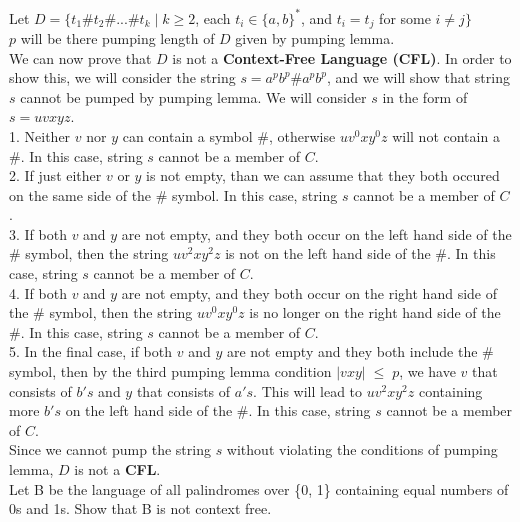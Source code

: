 \documentclass[12pt]{article}
\begin{document}
Let $D = \{t_1 \# t_2 \# ... \# t_k \; | \; k \geq 2$, each $t_i \in \{a, b\}^*$, and $t_i = t_j$ for some $i \ne j \} $ \\
$p$ will be there pumping length of $D$ given by pumping lemma. \\

We can now prove that $D$ is not a \textbf{Context-Free Language (CFL)}.
In order to show this, we will consider the string $s = a^p b^p \# a^p b^p $,
and we will show that string $s$ cannot be pumped by pumping lemma. We will
consider $s$ in the form of $s = uvxyz$. \\

1. Neither $v$ nor $y$ can contain a symbol $\#$, otherwise $u v^0 x y^0 z$
will not contain a $\#$. In this case, string $s$ cannot be a member of $C$. \\

2. If just either $v$ or $y$ is not empty, than we can assume that they both occured
on the same side of the $\#$ symbol. In this case, string $s$ cannot be a member of $C$. \\

3. If both $v$ and $y$ are not empty, and they both occur on the left hand side
of the $\#$ symbol, then the string $u v^2 x y^2 z$ is not on the left hand
side of the $\#$. In this case, string $s$ cannot be a member of $C$. \\

4. If both $v$ and $y$ are not empty, and they both occur on the right hand side
of the $\#$ symbol, then the string $u v^0 x y^0 z$ is no longer on the
right hand side of the $\#$. In this case, string $s$ cannot be a member of $C$. \\

5. In the final case, if both $v$ and $y$ are not empty and they both include
the $\#$ symbol, then by the third pumping lemma condition $|vxy| \; \le \; p$,
we have $v$ that consists of $b's$ and $y$ that consists of $a's$. This will
lead to $u v^2 x y^2 z$ containing more $b's$ on the left hand side of the $\#$.
In this case, string $s$ cannot be a member of $C$. \\

Since we cannot pump the string $s$ without violating the conditions of
pumping lemma, $D$ is not a \textbf{CFL}. \\

 Let B be the language of all palindromes over \{0, 1\} containing equal numbers of
0s and 1s. Show that B is not context free. \\
\end{document}
